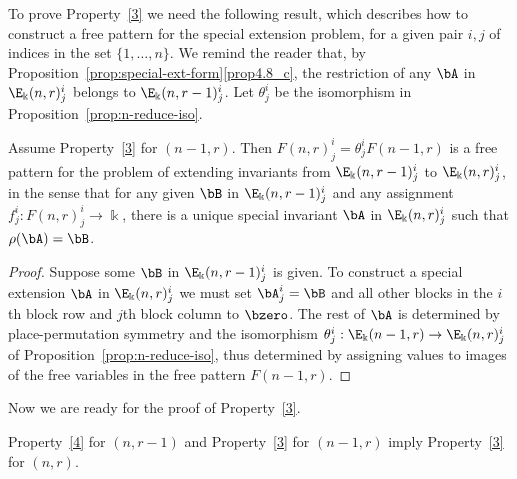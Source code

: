 To prove Property~\ref{3} we need the following result, which
describes how to construct a free pattern for the special extension
problem, for a given pair $i,j$ of indices in the set $\{1, \dots,
n\}$. We remind the reader that, by Proposition~\ref{prop:special-ext-form}\ref{prop4.8_c}, the restriction of any $\bA$ in
$\E_\Bbbk(n,r)^i_j$ belongs to $\E_\Bbbk(n,r-1)^i_j$. Let $\theta^i_j$
be the isomorphism in Proposition~\ref{prop:n-reduce-iso}.

\begin{lemm}\label{lem:free-special}
Assume Property~\ref{3} for $(n-1,r)$. Then $F(n,r)^i_j =
\theta^i_jF(n-1,r)$ is a free pattern for the problem of extending
invariants from $\E_\Bbbk(n,r-1)^i_j$ to $\E_\Bbbk(n,r)^i_j$, in the
sense that for any given $\bB$ in $\E_\Bbbk(n,r-1)^i_j$ and any
assignment $f^i_j: F(n,r)^i_j \to \Bbbk$, there is a unique special
invariant $\bA$ in $\E_\Bbbk(n,r)^i_j$ such that $\rho(\bA) = \bB$.
\end{lemm}

\begin{proof}
Suppose some $\bB$ in $\E_\Bbbk(n,r-1)^i_j$ is given. To construct a
special extension $\bA$ in $\E_\Bbbk(n,r)^i_j$ we must set $\bA^i_j =
\bB$ and all other blocks in the $i$th block row and $j$th block
column to $\bzero$. The rest of $\bA$ is determined by
place-permutation symmetry and the isomorphism $\theta^i_j:
\E_\Bbbk(n-1,r) \to \E_\Bbbk(n,r)^i_j$ of Proposition~\ref{prop:n-reduce-iso}, thus determined by assigning values to images
of the free variables in the free pattern $F(n-1,r)$.
\end{proof}


Now we are ready for the proof of Property~\ref{3}.

\begin{prop}\label{prop:free-ptns-exist}
 Property~\ref{4} for $(n,r-1)$ and Property~\ref{3} for $(n-1,r)$
 imply Property~\ref{3} for $(n,r)$.
\end{prop}


